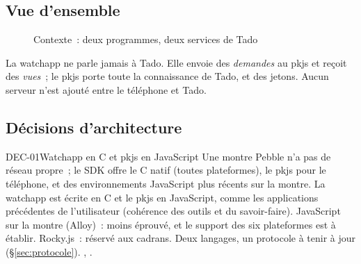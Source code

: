 \subsection{Vue d'ensemble}

\begin{figure}[H]
  \centering
  \caption{Contexte~: deux programmes, deux services de Tado}
  \label{fig:contexte}
\end{figure}

La watchapp ne parle jamais à Tado. Elle envoie des \emph{demandes} au pkjs et reçoit des
\emph{vues}~; le pkjs porte toute la connaissance de Tado, et des jetons. Aucun
serveur n'est ajouté entre le téléphone et Tado.

\subsection{Décisions d'architecture}
\label{sec:decisions}

\begin{decision}{DEC-01}{Watchapp en C et pkjs en JavaScript}
   Une montre Pebble n'a pas de réseau propre~; le SDK offre le C natif (toutes
  plateformes), le pkjs pour le téléphone, et des environnements JavaScript plus récents sur la montre.
   La watchapp est écrite en C et le pkjs en JavaScript, comme les applications
  précédentes de l'utilisateur (cohérence des outils et du savoir-faire).
   JavaScript sur la montre (Alloy)~: moins éprouvé, et le support
  des six plateformes est à établir. Rocky.js~: réservé aux cadrans.
   Deux langages, un protocole à tenir à jour (§\ref{sec:protocole}).
   , .
\end{decision}

